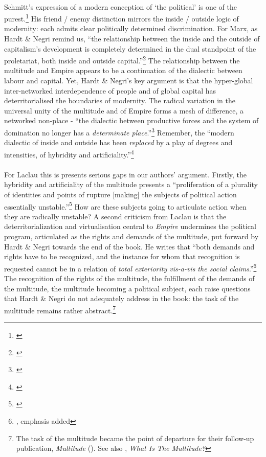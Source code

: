 \documentclass[12pt,a4paper,titlepage]{article}
\begin{document}
\paragraph{}Schmitt's expression of a modern conception of `the political' is one of the purest.\footnote{\cite{schmitt:2007cop}} His friend / enemy distinction mirrors the inside / outside logic of modernity: each admits clear politically determined discrimination. For Marx, as Hardt \& Negri remind us, ``the relationship between the inside and the outside of capitalism's development is completely determined in the dual standpoint of the proletariat, both inside and outside capital.''\footnote{\cite[p. 209]{Hardt:2001jl}} The relationship between the multitude and Empire appears to be a continuation of the dialectic between labour and capital. Yet, Hardt \& Negri's key argument is that the hyper-global inter-networked interdependence of people and of global capital has deterritorialised the boundaries of modernity. The radical variation in the universal unity of the multitude and of Empire forms a mesh of difference, a networked non-place - ``the dialectic between productive forces and the system of domination no longer has a \textit{determinate place}.''\footnote{\cite[p. 209]{Hardt:2001jl}} Remember, the ``modern dialectic of inside and outside has been \textit{replaced} by a play of degrees and intensities, of hybridity and artificiality.''\footnote{\cite[pp. 187-8, my emphasis.]{Hardt:2001jl}}

\paragraph{}For Laclau this is presents serious gaps in our authors' argument. Firstly, the hybridity and artificiality of the multitude presents a ``proliferation of a plurality of identities and points of rupture [making] the subjects of political action essentially unstable.''\footnote{\cite[p. 7]{laclau:2005ss}} How are these subjects going to articulate action when they are radically unstable? A second criticism from Laclau is that the deterritorialization and virtualisation central to \textit{Empire} undermines the political program, articulated as the rights and demands of the multitude, put forward by Hardt \& Negri towards the end of the book. He writes that ``both demands and rights have to be recognized, and the instance for whom that recognition is requested cannot be in a relation of \textit{total exteriority vis-a-vis the social claims}.''\footnote{\cite[p. 9]{laclau:2005ss}, emphasis added} The recognition of the rights of the multitude, the fulfillment of the demands of the multitude, the multitude becoming a political subject, each raise questions that Hardt \& Negri do not adequately address in the book: the task of the multitude remains rather abstract.\footnote{The task of the multitude became the point of departure for their follow-up publication, \textit{Multitude} (\cite{Hardt:2005zt}). See also \cite{brown:2005cs}, \textit{What Is The Multitude?}}
\end{document}
